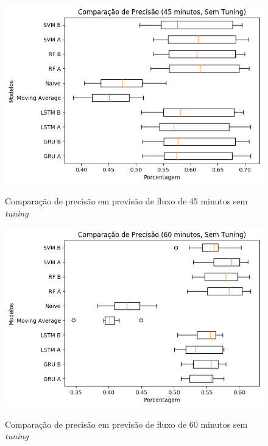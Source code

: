 \begin{figure}[htbp]
    \centering
    \includegraphics[scale=0.8]{monography/img/snapshots/comparacao_de_precisao_(45_minutos,_sem_tuning)_performance_boxes.png}
    \label{figure:comparacao_previsao_precisao_45_sem_tuning}
    \caption{Comparação de precisão em previsão de fluxo de 45 minutos sem \textit{tuning}}
\end{figure}

\begin{figure}[htbp]
    \centering
    \includegraphics[scale=0.8]{monography/img/snapshots/comparacao_de_precisao_(60_minutos,_sem_tuning)_performance_boxes.png}
    \label{figure:comparacao_previsao_precisao_60_sem_tuning}
    \caption{Comparação de precisão em previsão de fluxo de 60 minutos sem \textit{tuning}}
\end{figure}

